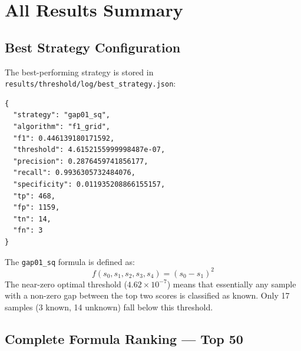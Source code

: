 \documentclass[11pt,a4paper]{article}
\newcommand{\formula}[1]{\texttt{#1}}
\begin{document}
\section{All Results Summary}

\subsection{Best Strategy Configuration}

The best-performing strategy is stored in \texttt{results/threshold/log/best\_strategy.json}:

\begin{tcolorbox}[colback=gray!5, colframe=gray!40, title={\textbf{best\_strategy.json}}, fonttitle=\bfseries]
\begin{verbatim}
{
  "strategy": "gap01_sq",
  "algorithm": "f1_grid",
  "f1": 0.446139180171592,
  "threshold": 4.6152155999998487e-07,
  "precision": 0.2876459741856177,
  "recall": 0.9936305732484076,
  "specificity": 0.011935208866155157,
  "tp": 468,
  "fp": 1159,
  "tn": 14,
  "fn": 3
}
\end{verbatim}
\end{tcolorbox}

\noindent The \formula{gap01\_sq} formula is defined as:
\[
f(s_0, s_1, s_2, s_3, s_4) = (s_0 - s_1)^2
\]
The near-zero optimal threshold ($4.62 \times 10^{-7}$) means that essentially any sample with a non-zero gap between the top two scores is classified as known. Only 17 samples (3 known, 14 unknown) fall below this threshold.

\subsection{Complete Formula Ranking --- Top 50}
\end{document}
